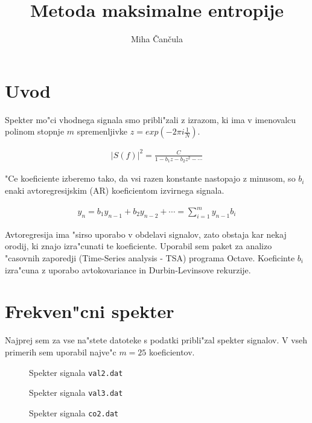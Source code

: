\documentclass[a4paper,10pt]{article}
\title{Metoda maksimalne entropije}
\author{Miha \v Can\v cula}
\begin{document}
\maketitle

\section{Uvod}

Spekter mo"ci vhodnega signala smo pribli"zali z izrazom, ki ima v imenovalcu polinom stopnje $m$ spremenljivke $z = exp(-2
\pi i \frac{1}{N})$. 

\begin{align}
 |S(f)|^2 = \frac{C}{1 - b_1 z - b_2 z^2 - \cdots}
\end{align}

"Ce koeficiente izberemo tako, da vsi razen konstante nastopajo z minusom, so $b_i$ enaki avtoregresijskim (AR) koeficientom izvirnega signala.

\begin{align}
 y_n = b_1 y_{n-1} + b_2 y_{n-2} + \cdots = \sum_{i=1}^m y_{n-1} b_i
\end{align}

Avtoregresija ima "sirso uporabo v obdelavi signalov, zato obstaja kar nekaj orodij, ki znajo izra"cunati te koeficiente. Uporabil sem paket za analizo "casovnih zaporedji (Time-Series analysis - TSA) programa Octave. Koeficinte $b_i$ izra"cuna z uporabo avtokovariance in Durbin-Levinsove rekurzije. 

\section{Frekven"cni spekter}

Najprej sem za vse na"stete datoteke s podatki pribli"zal spekter signalov. V vseh primerih sem uporabil najve"c $m=25$ koeficientov. 

\begin{figure}[h]
 
 \caption{Spekter signala \texttt{val2.dat}}
 \label{fig:psd-val2}
\end{figure}

\begin{figure}[h]
 
 \caption{Spekter signala \texttt{val3.dat}}
 \label{fig:psd-val3}
\end{figure}

\begin{figure}[h]
 
 \caption{Spekter signala \texttt{co2.dat}}
 \label{fig:psd-co2}
\end{figure}
\end{document}
